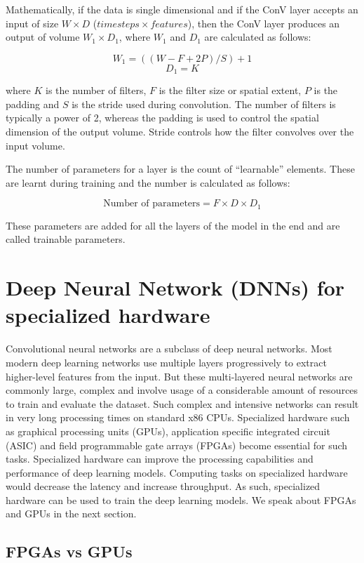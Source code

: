 Mathematically, if the data is single dimensional and if the ConV layer accepts an input of size $W \times D$ ($timesteps \times features$), then the ConV layer produces an output of volume $W_1 \times D_1$, where $W_1$ and $D_1$ are calculated as follows:

\[ W_1 = ( (W - F + 2P) / S) + 1 \]
\[ D_1 = K \]

where $K$ is the number of filters, $F$ is the filter size or spatial extent, $P$ is the padding and $S$ is the stride used during convolution. The number of filters is typically a power of 2, whereas the padding is used to control the spatial dimension of the output volume. Stride controls how the filter convolves over the input volume.

The number of parameters for a layer is the count of “learnable” elements. These are learnt during training and the number is calculated as follows:

\[\text{Number of parameters} = F \times D \times D_1\]

These parameters are added for all the layers of the model in the end and are called trainable parameters. 

\clearpage
\section{Deep Neural Network (DNNs) for specialized hardware}

Convolutional neural networks are a subclass of deep neural networks. Most modern deep learning networks use multiple layers progressively to extract higher-level features from the input. But these multi-layered neural networks are commonly large, complex and involve usage of a considerable amount of resources to train and evaluate the dataset. Such complex and intensive networks can result in very long processing times on standard x86 CPUs. Specialized hardware such as graphical processing units (GPUs), application specific integrated circuit (ASIC) and field programmable gate arrays (FPGAs) become essential for such tasks. Specialized hardware can improve the processing capabilities and performance of deep learning models. Computing tasks on specialized hardware would decrease the latency and increase throughput. As such, specialized hardware can be used to train the deep learning models. We speak about FPGAs and GPUs in the next section.

\subsection{FPGAs vs GPUs}

